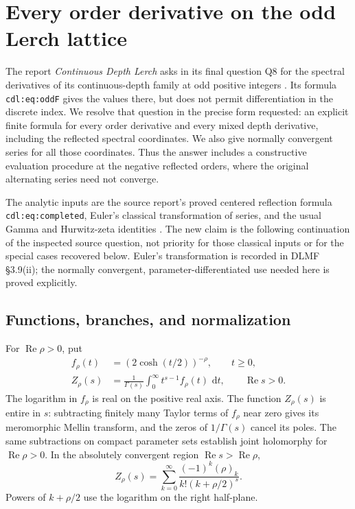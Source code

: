 \documentclass[11pt,a4paper]{article}
\numberwithin{equation}{section}
\theoremstyle{definition}
\theoremstyle{remark}
\DeclareMathOperator{\re}{Re}
\newcommand{\dd}{\,\mathrm d}
\begin{document}


\section{Every order derivative on the odd Lerch lattice}
\label{lj:sec:main}

The report \emph{Continuous Depth Lerch} asks in its final question Q8
for the spectral derivatives of its continuous-depth family at odd
positive integers \cite{Continuous}. Its formula \texttt{cdl:eq:oddF} gives the values there,
but does not permit differentiation in the discrete index. We resolve
that question in the precise form requested: an explicit finite formula
for every order derivative and every mixed depth derivative, including
the reflected spectral coordinates. We also give normally convergent
series for all those coordinates. Thus the answer includes a constructive
evaluation procedure at the negative reflected orders, where the original
alternating series need not converge.

The analytic inputs are the source report's proved centered reflection
formula \texttt{cdl:eq:completed}, Euler's classical transformation of
series, and the usual Gamma and Hurwitz-zeta identities \cite{DLMFEuler,DLMFGamma,DLMFZeta}. The new claim is
the following continuation of the inspected source question, not priority
for those classical inputs or for the special cases recovered below.
Euler's transformation is recorded in DLMF \S3.9(ii); the normally
convergent, parameter-differentiated use needed here is proved explicitly.

\subsection{Functions, branches, and normalization}

For $\re\rho>0$, put
\begin{align}
 f_\rho(t)&=(2\cosh(t/2))^{-\rho},\qquad t\geq0,
 \label{lj:eq:f}\\
 Z_\rho(s)&=\frac1{\Gamma(s)}
       \int_0^\infty t^{s-1}f_\rho(t)\,\dd t,
       \qquad \re s>0.
 \label{lj:eq:Z}
\end{align}
The logarithm in $f_\rho$ is real on the positive real axis. The function
$Z_\rho(s)$ is entire in $s$: subtracting finitely many Taylor terms of
$f_\rho$ near zero gives its meromorphic Mellin transform, and the zeros
of $1/\Gamma(s)$ cancel its poles. The same subtractions on compact
parameter sets establish joint holomorphy for $\re\rho>0$. In the
absolutely convergent region $\re s>\re\rho$,
\begin{equation}
 Z_\rho(s)=\sum_{k=0}^\infty
     \frac{(-1)^k(\rho)_k}{k!(k+\rho/2)^s}.
 \label{lj:eq:Zseries}
\end{equation}
Powers of $k+\rho/2$ use the logarithm on the right half-plane.
\end{document}
